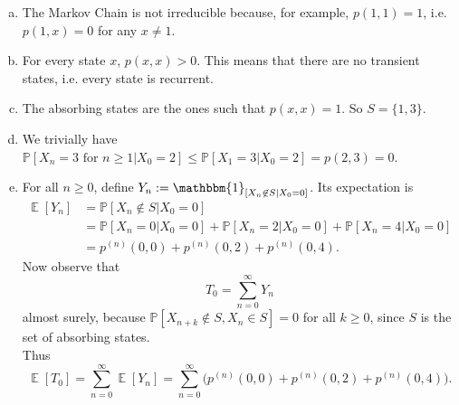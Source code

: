 \documentclass[12pt,a4paper]{report}
\theoremstyle{definition}
\theoremstyle{num.custom-title}
\DeclareMathOperator{\E}{\mathbb{E}}
\renewcommand{\1}{\mathbbm{1}}
\renewcommand{\P}{\mathbb{P}}
\begin{document}
\begin{enumerate}[(a)]
\item The Markov Chain is not irreducible because, for example, $p(1,1)=1$, i.e. $p(1,x)=0$ for any $x \neq 1$.
\item For every state $x$, $p(x,x)>0$. This means that there are no transient states, i.e. every state is recurrent.
\item The absorbing states are the ones such that $p(x,x)=1$. So $S = \{1,3\}$.
\item We trivially have $\P[X_n=3 \text{ for } n \geq 1 | X_0=2] \leq \P[X_1=3 | X_0=2] = p(2,3)=0$.
\item For all $n \geq 0$, define $Y_n := \1_{[X_n \not\in S | X_0=0]}$. Its expectation is
\begin{align*}
\E[Y_n] 
&= \P[X_n \not\in S | X_0=0] \\
&= \P[X_n=0 | X_0=0] + \P[X_n=2 | X_0=0] + \P[X_n=4 | X_0=0] \\
&= p^{(n)}(0,0) + p^{(n)}(0,2) + p^{(n)}(0,4).
\end{align*}
Now observe that
\[
T_0 = \sum_{n=0}^{\infty} Y_n
\]
almost surely, because $\P[X_{n+k} \not\in S, X_{n} \in S] = 0$ for all $k \geq 0$, since $S$ is the set of absorbing states.\\
Thus
\[
\E[T_0] = \sum_{n=0}^\infty \E[Y_n] = \sum_{n=0}^\infty \Big( p^{(n)}(0,0) + p^{(n)}(0,2) + p^{(n)}(0,4) \Big).
\]
\end{enumerate}
\end{document}
